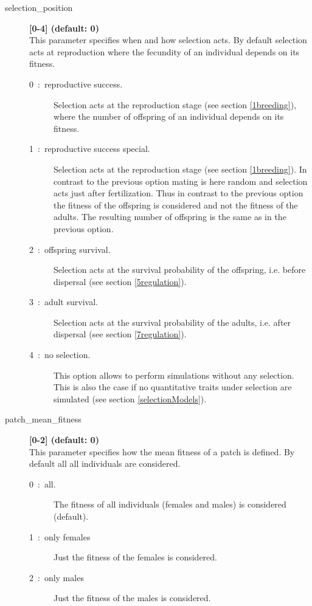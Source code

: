 \documentclass[letterpaper,12pt,oneside]{book}
\begin{document}
\begin{description}
\item[selection\_position] \textbf{[0-4] (default: 0)}\\
This parameter specifies when and how selection acts. By default selection acts at reproduction where the fecundity of an individual depends on its fitness.
\begin{description}
\item [0~:~reproductive success.] Selection acts at the reproduction stage (see section \ref{1breeding}), where the number of offspring of an individual depends on its fitness.
\item [1~:~reproductive success special.] Selection acts at the reproduction stage (see section \ref{1breeding}). In contrast to the previous option mating is here random and selection acts just after fertilization. Thus in contrast to the previous option the fitness of the offspring is considered and not the fitness of the adults. The resulting number of offspring is the same as in the previous option.
\item [2~:~offspring survival.] Selection acts at the survival probability of the offspring, i.e. before dispersal (see section \ref{5regulation}).
\item [3~:~adult survival.] Selection acts at the survival probability of the adults, i.e. after dispersal (see section \ref{7regulation}).
\item [4~:~no selection.] This option allows to perform simulations without any selection. This is also the case if no quantitative traits under selection are simulated (see section \ref{selectionModels}).
\end{description}

\item[patch\_mean\_fitness] \textbf{[0-2] (default: 0)}\\
This parameter specifies how the mean fitness of a patch is defined. By default all all individuals are considered.
\begin{description}
\item [0~:~all.] The fitness of all individuals (females and males) is considered (default).
\item [1~:~only females] Just the fitness of the females is considered.
\item [2~:~only males] Just the fitness of the males is considered.
\end{description}

\end{description}
\end{document}
